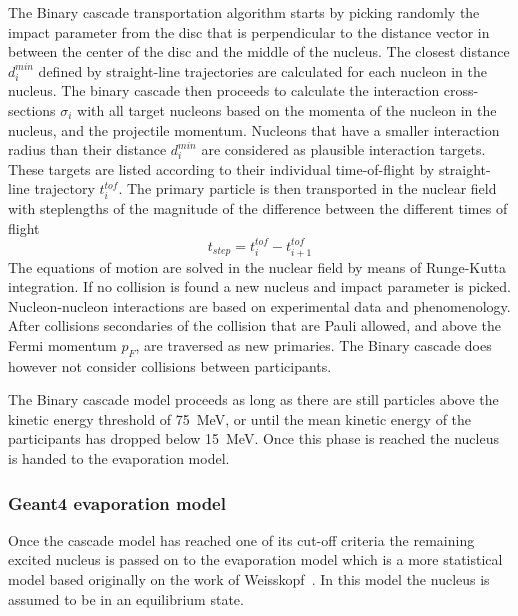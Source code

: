 The Binary cascade transportation algorithm starts by picking randomly the impact parameter from the disc that is perpendicular to the distance vector in between the center of the disc and the middle of the nucleus. The closest distance $d^{min}_{i}$ defined by straight-line trajectories are calculated for each nucleon in the nucleus. The binary cascade then proceeds to calculate the interaction cross-sections $\sigma_i$ with all target nucleons based on the momenta of the nucleon in the nucleus, and the projectile momentum. Nucleons that have a smaller interaction radius than their distance $d^{min}_{i}$ are considered as plausible interaction targets. These targets are listed according to their individual time-of-flight by straight-line trajectory $t^{tof}_i$. The primary particle is then transported in the nuclear field with steplengths of the magnitude of the difference between the different times of flight \begin{equation}t_{step} = t^{tof}_i - t^{tof}_{i+1}\end{equation}The equations of motion are solved in the nuclear field by means of Runge-Kutta integration. If no collision is found a new nucleus and impact parameter is picked.
Nucleon-nucleon interactions are based on experimental data and phenomenology. After collisions secondaries of the collision that are Pauli allowed, and above the Fermi momentum $p_F$, are traversed as new primaries. The Binary cascade does however not consider collisions between participants.

The Binary cascade model proceeds as long as there are still particles above the kinetic energy threshold  of 75~MeV, or until the mean kinetic energy of the participants has dropped below 15~MeV. Once this phase is reached the nucleus is handed to the evaporation model.

\subsubsection{Geant4 evaporation model}

Once the cascade model has reached one of its cut-off criteria the remaining excited nucleus is passed on to the evaporation model which is a more statistical model based originally on the work of Weisskopf~\cite{Weisskopf}. In this model the nucleus is assumed to be in an equilibrium state.

